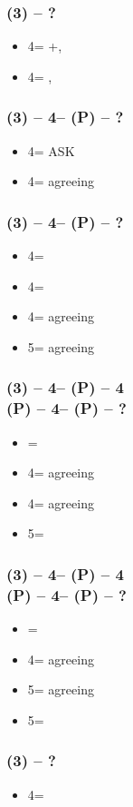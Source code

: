 \documentclass[12pt, a4paper]{article}
\begin{document}
\subsubsection*{(3\clubs) -- ?}
\begin{itemize}
    \item 4\clubs = \diams+\major, \gf
    \item 4\diams = \major, \gf
\end{itemize}

\subsubsection*{(3\clubs) -- 4\clubs -- (P) -- ?}
\begin{itemize}
    \item 4\diams = ASK \major
    \item 4\hearts = agreeing \diams \vimp
\end{itemize}

\subsubsection*{(3\clubs) -- 4\diams -- (P) -- ?}
\begin{itemize}
    \item 4\hearts = \soff
    \item 4\spades = \soff
    \item 4\nt = agreeing \hearts
    \item 5\clubs = agreeing \spades
\end{itemize}

\subsubsection*{(3\clubs) -- 4\clubs -- (P) -- 4\diams
                \\(P) -- 4\hearts -- (P) -- ?}
\begin{itemize}
    \item \pass = \soff
    \item 4\spades = agreeing \diams
    \item 4\nt = agreeing \hearts
    \item 5\diams = \soff
\end{itemize}

\subsubsection*{(3\clubs) -- 4\clubs -- (P) -- 4\diams
                \\(P) -- 4\spades -- (P) -- ?}
\begin{itemize}
    \item \pass = \soff
    \item 4\nt = agreeing \diams
    \item 5\clubs = agreeing \spades
    \item 5\diams = \soff
\end{itemize}

\subsubsection*{(3\diams) -- ?}
\begin{itemize}
    \item 4\clubs = \nat \imp
\end{itemize}

\end{document}
